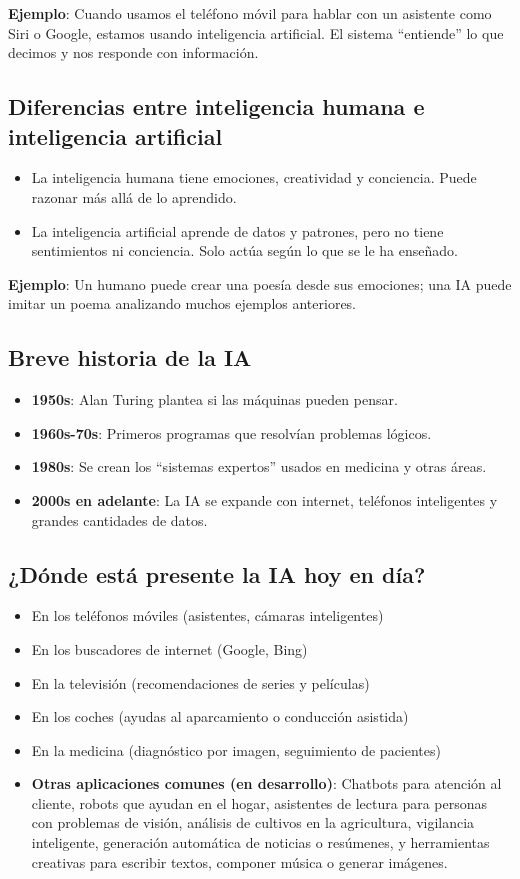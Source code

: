\documentclass[12pt]{article}
\begin{document}
	\textbf{Ejemplo}: Cuando usamos el teléfono móvil para hablar con un asistente como Siri o Google, estamos usando inteligencia artificial. El sistema “entiende” lo que decimos y nos responde con información.
	
	\subsection*{Diferencias entre inteligencia humana e inteligencia artificial}
	\begin{itemize}
		\item La inteligencia humana tiene emociones, creatividad y conciencia. Puede razonar más allá de lo aprendido.
		\item La inteligencia artificial aprende de datos y patrones, pero no tiene sentimientos ni conciencia. Solo actúa según lo que se le ha enseñado.
	\end{itemize}
	
	\textbf{Ejemplo}: Un humano puede crear una poesía desde sus emociones; una IA puede imitar un poema analizando muchos ejemplos anteriores.
	
	\subsection*{Breve historia de la IA}
	\begin{itemize}
		\item \textbf{1950s}: Alan Turing plantea si las máquinas pueden pensar.
		\item \textbf{1960s-70s}: Primeros programas que resolvían problemas lógicos.
		\item \textbf{1980s}: Se crean los “sistemas expertos” usados en medicina y otras áreas.
		\item \textbf{2000s en adelante}: La IA se expande con internet, teléfonos inteligentes y grandes cantidades de datos.
	\end{itemize}
	
	\subsection*{¿Dónde está presente la IA hoy en día?}
	\begin{itemize}
		\item En los teléfonos móviles (asistentes, cámaras inteligentes)
		\item En los buscadores de internet (Google, Bing)
		\item En la televisión (recomendaciones de series y películas)
		\item En los coches (ayudas al aparcamiento o conducción asistida)
		\item En la medicina (diagnóstico por imagen, seguimiento de pacientes)
		\item \textbf{Otras aplicaciones comunes (en desarrollo)}: Chatbots para atención al cliente, robots que ayudan en el hogar, asistentes de lectura para personas con problemas de visión, análisis de cultivos en la agricultura, vigilancia inteligente, generación automática de noticias o resúmenes, y herramientas creativas para escribir textos, componer música o generar imágenes.
	\end{itemize}
	
\end{document}
